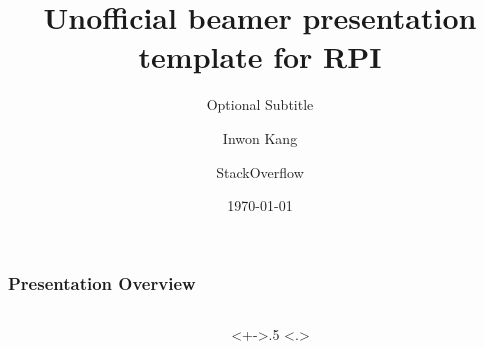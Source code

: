 \documentclass[
	11pt, %
	aspectratio=169, %
]{beamer}
\title[A Short Title for Your Slides]{Unofficial beamer presentation template for RPI}
\subtitle{Optional Subtitle} %
\author[]{Inwon Kang \and StackOverflow} %
\institute[RPI]{Department of Computer Science} %
\date[\today]{\today} %
\begin{document}
\begin{frame}
	\titlepage %
\end{frame}



\begin{frame}
	\frametitle{Presentation Overview} %

  \begin{columns}[t]
    \begin{column}{.5\textwidth}
      \tableofcontents[
        pausesections,
        sections={-4}
    ]
    \end{column}
    \begin{column}<+->{.5\textwidth}
      \only<.>{\setcounter{tocseccounter}{\slideinframe}}
      \advanceslidecounter{-\thetocseccounter}
      \tableofcontents[
        pausesections,
        sections={5-}
      ]
    \end{column}
  \end{columns}
  \addtocounter{framenumber}{-1}


\end{frame}
\end{document}
